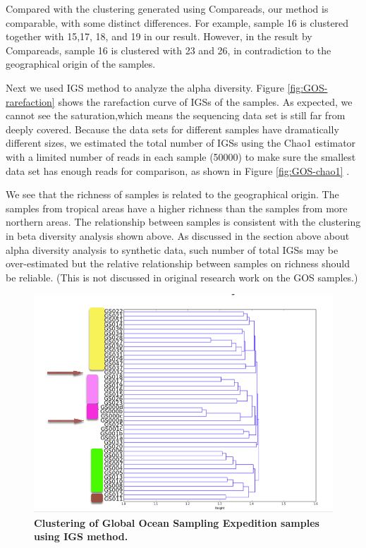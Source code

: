 \documentclass{article}
\begin{document}

Compared with the clustering generated using Compareads, our method is comparable, with some 
distinct differences. For example, sample 16 is clustered together with 15,17,
18, and 19 in our result. However, in the result by Compareads, sample 16 is clustered 
with 23 and 26, in contradiction to the geographical origin of the samples.

Next we used IGS method to analyze the alpha diversity.
Figure \ref{fig:GOS-rarefaction} shows the rarefaction curve of IGSs of the samples.
As expected, we cannot see the saturation,which means the sequencing data 
set is still far from deeply covered.
Because the data sets for different samples have dramatically different sizes, 
we estimated the total number of IGSs using the Chao1 estimator with a limited 
number of reads in each sample (50000) to make sure the smallest data set 
has enough reads for comparison, as shown in Figure \ref{fig:GOS-chao1} .

We see that the richness of samples is related to the geographical 
origin. The samples from tropical areas have a higher richness than
the samples from more northern areas. The relationship between samples is 
consistent with the clustering in beta diversity analysis shown above.
As discussed in the section above about alpha diversity analysis 
to synthetic data, such number of total IGSs may be over-estimated but
the relative relationship between samples on richness should be reliable.
(This is not discussed in original research work on the GOS samples.)

\begin{figure}[!ht]
 \centerline{\includegraphics[width=6in]{./figures/GOS_cluster.png}}
\caption{\bf Clustering of Global Ocean Sampling Expedition samples using IGS
method.}
\label{fig:GOS-beta}
\end{figure}
\end{document}
